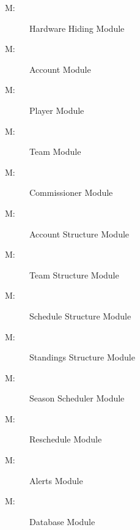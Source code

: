 \documentclass[12pt, titlepage]{article}
\newcounter{mnum}
\newcommand{\mthemnum}{M\themnum}
\begin{document}
\begin{description}
  \item [ \mthemnum \label{mHH}:] Hardware Hiding Module
  \item [ \mthemnum \label{mAC}:] Account Module
  \item [ \mthemnum \label{mPL}:] Player Module
  \item [ \mthemnum \label{mTE}:] Team Module
  \item [ \mthemnum \label{mCM}:] Commissioner Module
  \item [ \mthemnum \label{mAS}:] Account Structure
  Module
  \item [ \mthemnum \label{mTS}:] Team Structure Module
  \item [ \mthemnum \label{mSS}:] Schedule Structure
  Module
  \item [ \mthemnum \label{mST}:] Standings Structure
  Module
  \item [ \mthemnum \label{mS}:] Season Scheduler Module
  \item [ \mthemnum \label{mRE}:] Reschedule Module
  \item [ \mthemnum \label{mAL}:] Alerts Module
  \item [ \mthemnum \label{mDB}:] Database Module
\end{description}
\end{document}
